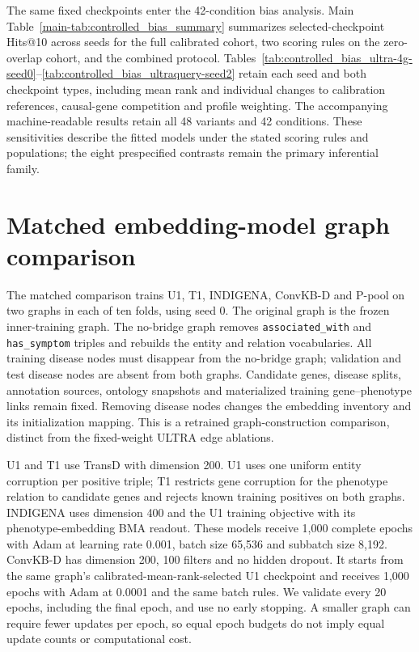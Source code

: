 \documentclass{article}
\begin{document}
The same fixed checkpoints enter the 42-condition bias analysis. Main
Table~\ref{main-tab:controlled_bias_summary} summarizes selected-checkpoint
Hits@10 across seeds for the full calibrated cohort, two scoring rules on the
zero-overlap cohort, and the combined protocol. Tables~\ref{tab:controlled_bias_ultra-4g-seed0}--\ref{tab:controlled_bias_ultraquery-seed2}
retain each seed and both checkpoint types, including mean rank and individual
changes to calibration references, causal-gene competition and profile weighting.
The accompanying machine-readable results retain all 48 variants and 42
conditions. These sensitivities describe the fitted models under the stated
scoring rules and populations; the eight prespecified contrasts remain the
primary inferential family.









\section{Matched embedding-model graph comparison}
\label{sec:matched_kge}

The matched comparison trains U1, T1, INDIGENA, ConvKB-D and P-pool on two
graphs in each of ten folds, using seed 0. The original graph is the frozen
inner-training graph. The no-bridge graph removes
\texttt{associated\_with} and \texttt{has\_symptom} triples and rebuilds
the entity and relation vocabularies. All training disease nodes must disappear
from the no-bridge graph; validation and test disease nodes are absent from
both graphs. Candidate genes, disease splits, annotation sources, ontology
snapshots and materialized training gene--phenotype links remain fixed.
Removing disease nodes changes the embedding inventory and its initialization
mapping. This is a retrained graph-construction comparison, distinct from the
fixed-weight ULTRA edge ablations.

U1 and T1 use TransD with dimension 200. U1 uses one uniform entity corruption
per positive triple; T1 restricts gene corruption for the phenotype relation
to candidate genes and rejects known training positives on both graphs.
INDIGENA uses dimension 400 and the U1 training objective with its
phenotype-embedding BMA readout. These models receive 1,000 complete epochs
with Adam at learning rate 0.001, batch size 65,536 and subbatch size 8,192.
ConvKB-D has dimension 200, 100 filters and no hidden dropout. It starts from
the same graph's calibrated-mean-rank-selected U1 checkpoint and receives
1,000 epochs with Adam at 0.0001 and the same batch rules. We validate every
20 epochs, including the final epoch, and use no early stopping. A smaller
graph can require fewer updates per epoch, so equal epoch budgets do not imply
equal update counts or computational cost.
\end{document}

